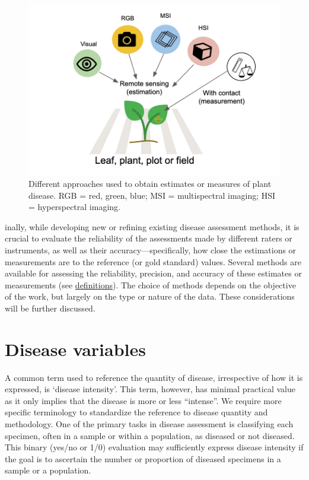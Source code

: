 \documentclass[
  letterpaper,
  DIV=11,
  numbers=noendperiod]{scrreprt}
\begin{document}
\begin{figure}

{\centering \includegraphics[width=5.10417in,height=\textheight]{imgs/disease_measure.png}

}

\caption{\label{fig-disease_measure}Different approaches used to obtain
estimates or measures of plant disease. RGB = red, green, blue; MSI =
multispectral imaging; HSI = hyperspectral imaging.}

\end{figure}

inally, while developing new or refining existing disease assessment
methods, it is crucial to evaluate the reliability of the assessments
made by different raters or instruments, as well as their
accuracy---specifically, how close the estimations or measurements are
to the reference (or gold standard) values. Several methods are
available for assessing the reliability, precision, and accuracy of
these estimates or measurements (see
\href{data-accuracy.html}{definitions}). The choice of methods depends
on the objective of the work, but largely on the type or nature of the
data. These considerations will be further discussed.

\hypertarget{disease-variables-1}{%
\section{Disease variables}\label{disease-variables-1}}

A common term used to reference the quantity of disease, irrespective of
how it is expressed, is `disease intensity'. This term, however, has
minimal practical value as it only implies that the disease is more or
less ``intense''. We require more specific terminology to standardize
the reference to disease quantity and methodology. One of the primary
tasks in disease assessment is classifying each specimen, often in a
sample or within a population, as diseased or not diseased. This binary
(yes/no or 1/0) evaluation may sufficiently express disease intensity if
the goal is to ascertain the number or proportion of diseased specimens
in a sample or a population.
\end{document}
